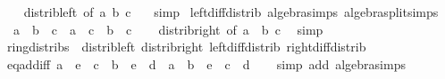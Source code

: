 \begin{isabellebody}
%
\isadelimproof
\ \ %
\endisadelimproof
%
\isatagproof
{}\isamarkupfalse%
\ distrib{\isacharunderscore}{\kern0pt}left\ {\isacharbrackleft}{\kern0pt}of\ a\ b\ {\isachardoublequoteopen}{\isacharminus}{\kern0pt}c\ {\isachardoublequoteclose}{\isacharbrackright}{\kern0pt}\ \isamarkupfalse%
\ simp%
\endisatagproof
{\isafoldproof}%
%
\isadelimproof
\isanewline
%
\endisadelimproof
\isanewline
{}\isamarkupfalse%
\ left{\isacharunderscore}{\kern0pt}diff{\isacharunderscore}{\kern0pt}distrib\ {\isacharbrackleft}{\kern0pt}algebra{\isacharunderscore}{\kern0pt}simps{\isacharcomma}{\kern0pt}\ algebra{\isacharunderscore}{\kern0pt}split{\isacharunderscore}{\kern0pt}simps{\isacharbrackright}{\kern0pt}{\isacharcolon}{\kern0pt}\isanewline
\ \ {\isachardoublequoteopen}{\isacharparenleft}{\kern0pt}a\ {\isacharminus}{\kern0pt}\ b{\isacharparenright}{\kern0pt}\ {\isacharasterisk}{\kern0pt}\ c\ {\isacharequal}{\kern0pt}\ a\ {\isacharasterisk}{\kern0pt}\ c\ {\isacharminus}{\kern0pt}\ b\ {\isacharasterisk}{\kern0pt}\ c{\isachardoublequoteclose}\isanewline
%
\isadelimproof
\ \ %
\endisadelimproof
%
\isatagproof
{}\isamarkupfalse%
\ distrib{\isacharunderscore}{\kern0pt}right\ {\isacharbrackleft}{\kern0pt}of\ a\ {\isachardoublequoteopen}{\isacharminus}{\kern0pt}\ b{\isachardoublequoteclose}\ c{\isacharbrackright}{\kern0pt}\ \isamarkupfalse%
\ simp%
\endisatagproof
{\isafoldproof}%
%
\isadelimproof
\isanewline
%
\endisadelimproof
\isanewline
{}\isamarkupfalse%
\ ring{\isacharunderscore}{\kern0pt}distribs\ {\isacharequal}{\kern0pt}\ distrib{\isacharunderscore}{\kern0pt}left\ distrib{\isacharunderscore}{\kern0pt}right\ left{\isacharunderscore}{\kern0pt}diff{\isacharunderscore}{\kern0pt}distrib\ right{\isacharunderscore}{\kern0pt}diff{\isacharunderscore}{\kern0pt}distrib\isanewline
\isanewline
{}\isamarkupfalse%
\ eq{\isacharunderscore}{\kern0pt}add{\isacharunderscore}{\kern0pt}iff{}{\isacharcolon}{\kern0pt}\ {\isachardoublequoteopen}a\ {\isacharasterisk}{\kern0pt}\ e\ {\isacharplus}{\kern0pt}\ c\ {\isacharequal}{\kern0pt}\ b\ {\isacharasterisk}{\kern0pt}\ e\ {\isacharplus}{\kern0pt}\ d\ {\isasymlongleftrightarrow}\ {\isacharparenleft}{\kern0pt}a\ {\isacharminus}{\kern0pt}\ b{\isacharparenright}{\kern0pt}\ {\isacharasterisk}{\kern0pt}\ e\ {\isacharplus}{\kern0pt}\ c\ {\isacharequal}{\kern0pt}\ d{\isachardoublequoteclose}\isanewline
%
\isadelimproof
\ \ %
\endisadelimproof
%
\isatagproof
{}\isamarkupfalse%
\ {\isacharparenleft}{\kern0pt}simp\ add{\isacharcolon}{\kern0pt}\ algebra{\isacharunderscore}{\kern0pt}simps{\isacharparenright}{\kern0pt}%

\end{isabellebody}
